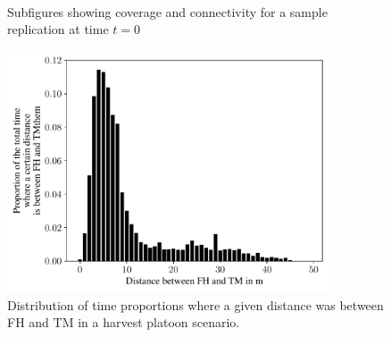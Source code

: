 \begin{figure}%
    \centering
	\\
    \caption{Subfigures showing coverage and connectivity for a sample replication at time $t=0$}%
    \label{fig:setups12}%
\end{figure}
\begin{figure}%
	\centering
	\includegraphics[width=0.85\textwidth]{figures/distanceHarvestScenario.pdf}
	\caption{Distribution of time proportions where a given distance was between \acf{FH} and \acf{TM} in a harvest platoon scenario.}%
	\label{fig:distance}%
\end{figure}
